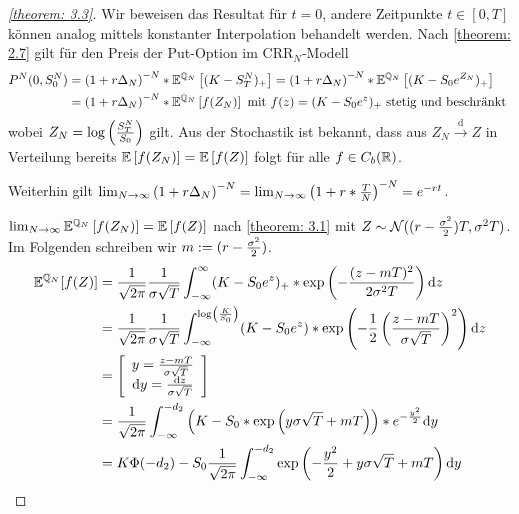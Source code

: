 \begin{proof}[\cref{theorem: 3.3}]	
	Wir beweisen das Resultat für $t = 0$, andere Zeitpunkte $t \in [0,T]$ können analog mittels konstanter Interpolation behandelt werden. Nach \cref{theorem: 2.7} gilt für den Preis der Put-Option im CRR${}_N$-Modell 
	\begin{align*}
		P^N(0,S_0^N) &= \left( 1 + r \Delta_N \right)^{-N} * \mathbb{E}^{\mathbb{Q}_N}\left[ (K- S_T^N)_+ \right] 
		= \left( 1 + r \Delta_N \right)^{-N} *  \mathbb{E}^{\mathbb{Q}_N}\left[ (K- S_0 e^	{Z_N})_+ \right] \\
		&= \left( 1 + r \Delta_N \right)^{-N} * \mathbb{E}^{\mathbb{Q}_N}\left[ f(Z_N) \right] \text{ mit } f(z) = (K - S_0 e^z)_+ \text{ stetig und beschränkt }
	\end{align*}
	wobei $Z_N = \log\left( \frac{S_T^N}{S_0} \right)$ gilt. Aus der Stochastik ist bekannt, dass aus $Z_N \overset{\mathrm{d}}{\to} Z$ in Verteilung bereits $\mathbb{E} \left[ f(Z_N) \right] = \mathbb{E} \left[ f(Z) \right]$ folgt für alle $f \in C_b(\mathbb{R})$.
	
	Weiterhin gilt $\lim_{N \to \infty} \left( 1 + r \Delta_N \right)^{-N} = \lim_{N \to \infty} \left( 1 + r * \frac{T}{N} \right)^{-N} = e^{-r t}$.
	
	$\lim_{N \to \infty} \mathbb{E}^{\mathbb{Q}_N}\left[ f(Z_N) \right] = \mathbb{E} \left[ f(Z) \right]$ nach \cref{theorem: 3.1} mit $Z \sim \mathcal{N}((r-\frac{\sigma^2}{2})T , \sigma^2 T)$. Im Folgenden schreiben wir $m \mathrel{:=} (r-\frac{\sigma^2}{2})$. 
	\begin{align*}
		\mathbb{E}^{\mathbb{Q}_N}[f(Z)] &= \frac{1}{\sqrt{2 \pi}} \frac{1}{\sigma \sqrt{T}}  \int_{-\infty}^\infty (K - S_0 e^z)_+ * \exp \left( - \frac{(z - mT)^2}{2 \sigma^2 T} \right) \mathrm{d}{z} \\
		&= \frac{1}{\sqrt{2 \pi}}  \frac{1}{\sigma \sqrt{T}} \int_{-\infty}^{\log\left( \frac{K}{S_0} \right)} (K - S_0 e^z) * \exp \left( - \frac{1}{2} \left( \frac{z - mT}{ \sigma \sqrt{T}} \right)^2 \right) \mathrm{d}{z} \\
		&= \left[  \begin{array}{c}
			y = \frac{z - m T}{\sigma \sqrt{T}} \\
			\mathrm{d} y = \frac{\mathrm{d} z}{\sigma \sqrt{T}}
			\end{array}  \right] \\
		&= \frac{1}{\sqrt{2 \pi}}  \int_{-\infty}^{-d_2} \left( K - S_0  * \exp \left( y \sigma \sqrt{T} + mT \right) \right) * e^{-\frac{y^2}{2}} \mathrm{d}{y} \\
		&= K \Phi(-d_2) - S_0 \frac{1}{\sqrt{2\pi}} \int_{-\infty}^{-d_2} \exp \left( - \frac{y^2}{2} + y \sigma \sqrt{T} + mT \right) \mathrm{d}{y} 
	\end{align*}
	

\end{proof}
